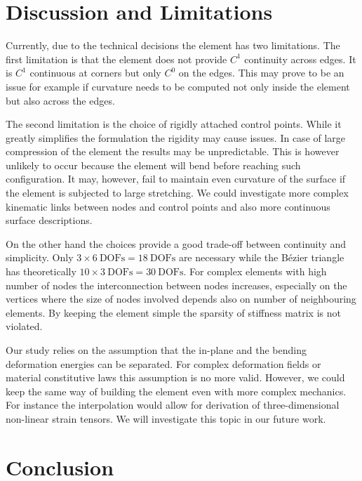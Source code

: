 \documentclass{egpubl}
\begin{document}

\section{Discussion and Limitations} %

Currently, due to the technical decisions the element has two limitations.
The first limitation is that the element does not provide $C^1$ continuity
across edges. It is $C^1$ continuous at corners but only $C^0$ on the
edges. This may prove to be an issue for example if curvature needs to be
computed not only inside the element but also across the edges.

The second limitation is the choice of rigidly attached control points. 
While it greatly simplifies the formulation the rigidity may cause issues.
In case of large compression of the element the results may be
unpredictable. This is however unlikely to occur because the element will
bend before reaching such configuration. It may, however, fail to maintain
even curvature of the surface if the element is subjected to large
stretching.
We could investigate more complex kinematic links between nodes and control points 
and also more continuous surface descriptions.

On the other hand the choices provide a good trade-off between continuity
and simplicity. Only $ 3 \times 6~\mathrm{DOFs} = 18~\mathrm{DOFs}$ are
necessary while the B\'ezier triangle has theoretically $ 10 \times
3~\mathrm{DOFs} = 30~\mathrm{DOFs}$. For complex elements with high number
of nodes the interconnection between nodes increases, especially on the
vertices where the size of nodes involved depends also on number of
neighbouring elements. By keeping the element simple the sparsity of
stiffness matrix is not violated.

Our study relies on the assumption that the in-plane and the bending deformation energies can be separated.
For complex deformation fields or material constitutive laws  this assumption is no more valid.
However, we could keep the same way of building the element even with more complex mechanics. 
For instance the interpolation would allow for derivation of three-dimensional non-linear strain tensors.
We will investigate this topic in our future work.

\section{Conclusion} %
\end{document}
